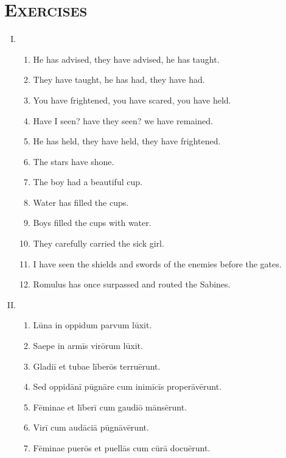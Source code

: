 \documentclass[12pt]{article}
\begin{document}
\section{\textsc{Exercises}}
\begin{enumerate}[I.]
	\setlength{\itemsep}{1em}
	\item \begin{enumerate}[1)]
		\item He has advised, they have advised, he has taught.
		\item They have taught, he has had, they have had.
		\item You have frightened, you have scared, you have held.
		\item Have I seen? have they seen? we have remained.
		\item He has held, they have held, they have frightened.
		\item The stars have shone.
		\item The boy had a beautiful cup.
		\item Water has filled the cups.
		\item Boys filled the cups with water.
		\item They carefully carried the sick girl.
		\item I have seen the shields and swords of the enemies before the gates.
		\item Romulus has once surpassed and routed the Sabines.
	\end{enumerate}
	\item \begin{enumerate}[1)]
		\item Lūna in oppidum parvum lūxit.
		\item Saepe in armīs virōrum lūxit.
		\item Gladiī et tubae līberōs terruērunt.
		\item Sed oppidānī pūgnāre cum inimīcīs properāvērunt.
		\item Fēminae et līberī cum gaudiō mānsērunt.
		\item Virī cum audāciā pūgnāvērunt.
		\item Fēminae puerōs et puellās cum cūrā docuērunt.
	\end{enumerate}
\end{enumerate}
\end{document}
